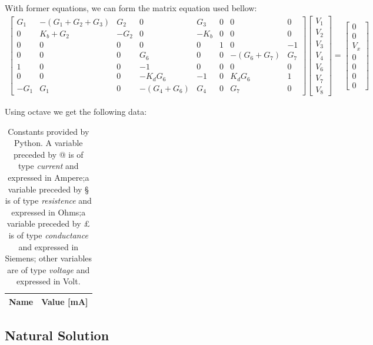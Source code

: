With former equations, we can form the matrix equation used bellow:
\begin{gather}
	\begin{bmatrix}
		G_1 & -(G_1 + G_2 + G_3) & G_2 & 0 & G_3 & 0 & 0 & 0 \\ 
		0 & K_b + G_2 & -G_2 & 0 & -K_b & 0 & 0 & 0 \\
		0 & 0 & 0 & 0 & 0 & 1 & 0 & -1 \\ 
		0 & 0 & 0 & G_6 & 0 & 0 & -(G_6 + G_7) & G_7 \\
		1 & 0 & 0 & -1 & 0 & 0 & 0 & 0 \\
		0 & 0 & 0 & -K_dG_6 & -1 & 0 & K_dG_6 & 1 \\
		-G_1 & G_1 & 0 & -(G_4 + G_6) & G_4 & 0 & G_7 & 0
	\end{bmatrix}
	\begin{bmatrix} V_1 \\ V_2 \\ V_3 \\ V_4 \\ V_6 \\ V_7 \\ V_8 
	\end{bmatrix}
	=
	\begin{bmatrix} 0 \\ 0 \\ V_x \\ 0 \\ 0 \\ 0 \\ 0 
	\end{bmatrix}
\end{gather}

Using octave we get the following data:
\begin{table}[!h]
	\centering
	\begin{tabular}{|l|r|}
		\hline    
		{\bf Name} & {\bf Value [mA]} \\ \hline
		
	\end{tabular}
	\caption{Constants provided by Python. A variable preceded by @ is of type {\em current}
		and expressed in Ampere;a variable preceded by § is of type {\it resistence} and expressed in
		Ohms;a variable preceded by £ is of type {\it conductance} and expressed in
		Siemens; other variables are of type {\it voltage} and expressed in
		Volt.}
	\label{tab:op}
\end{table}


\subsection{Natural Solution}

